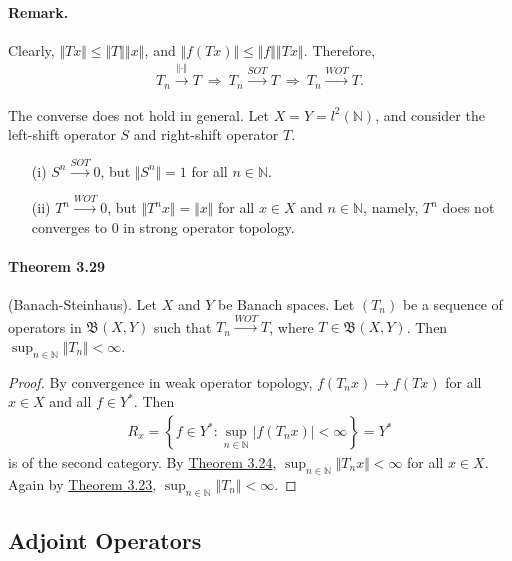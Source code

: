 \documentclass{article}
\begin{document}
\paragraph{Remark.} Clearly, $\Vert Tx\Vert\leq\Vert T\Vert\left\Vert x\right\Vert$, and $\Vert f(Tx)\Vert\leq\Vert f\Vert\left\Vert Tx\right\Vert$. Therefore,
\begin{align*}
	T_n\overset{\Vert\cdot\Vert}{\to} T\ \Rightarrow\ T_n\overset{SOT}{\to} T\ \Rightarrow\ T_n\overset{WOT}{\to} T.
\end{align*}

The converse does not hold in general. Let $X=Y=l^2(\mathbb{N})$, and consider the left-shift operator $S$ and right-shift operator $T$. 
\begin{itemize}
	\vspace{0.1cm}
	\item[(i)] $S^n\overset{SOT}{\to} 0$, but $\Vert S^n\Vert=1$ for all $n\in\mathbb{N}$.
	\vspace{0.1cm}
	\item[(ii)] $T^n\overset{WOT}{\to} 0$, but $\Vert T^n x\Vert = \Vert x\Vert$ for all $x\in X$ and $n\in\mathbb{N}$, namely, $T^n$ does not converges to $0$ in strong operator topology.
\end{itemize}

\paragraph{Theorem 3.29\label{thm:3.29}} (Banach-Steinhaus). Let $X$ and $Y$ be Banach spaces. Let $(T_n)$ be a sequence of operators in $\mathfrak{B}(X,Y)$ such that $T_n\overset{WOT}{\to} T$, where $T\in\mathfrak{B}(X,Y)$. Then $\sup_{n\in\mathbb{N}}\Vert T_n\Vert<\infty$.
\begin{proof}
By convergence in weak operator topology, $f(T_nx)\to f(Tx)$ for all $x\in X$ and all $f\in Y^*$. Then
\begin{align*}
	R_x=\left\{f\in Y^*:\sup_{n\in\mathbb{N}}\left\vert f(T_n x)\right\vert<\infty\right\}=Y^*
\end{align*}
is of the second category. By \hyperref[thm:3.24]{Theorem 3.24}, $\sup_{n\in\mathbb{N}}\Vert T_n x\Vert < \infty$ for all $x\in X$. Again by \hyperref[thm:3.23]{Theorem 3.23}, $\sup_{n\in\mathbb{N}}\Vert T_n\Vert < \infty$.
\end{proof}

\newpage
\subsection{Adjoint Operators}
\end{document}
